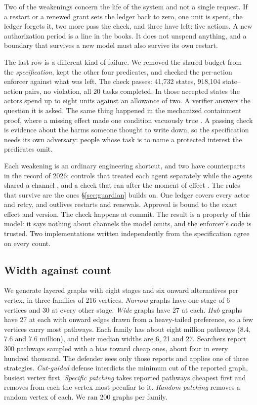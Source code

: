 \documentclass[10pt,twocolumn,letterpaper]{article}
\theoremstyle{definition}
\newcommand{\NarrowPaths}{8.4}
\newcommand{\HubPaths}{7.6}
\newcommand{\WidePaths}{7.6}
\newcommand{\WidthNarrow}{6}
\newcommand{\WidthHub}{21}
\newcommand{\WidthWide}{27}
\newcommand{\SeenPerHundredK}{four}
\newcommand{\BndTasks}{20}
\newcommand{\BndOmitStates}{41{,}732}
\newcommand{\BndOmitChecks}{918{,}104}
\newcommand{\BndOmitSpend}{eight}
\begin{document}
Two of the weakenings concern the life of the system and not a single request. If a restart or a renewed grant sets the ledger back to zero, one unit is spent, the ledger forgets it, two more pass the check, and three have left: five actions. A new authorization period is a line in the books. It does not unspend anything, and a boundary that survives a new model must also survive its own restart.

The last row is a different kind of failure. We removed the shared budget from the \emph{specification}, kept the other four predicates, and checked the per-action enforcer against what was left. The check passes: \BndOmitStates{} states, \BndOmitChecks{} state--action pairs, no violation, all \BndTasks{} tasks completed. In those accepted states the actors spend up to \BndOmitSpend{} units against an allowance of two. A verifier answers the question it is asked. The same thing happened in the mechanized containment proof, where a missing effect made one condition vacuously true \cite{moon}. A passing check is evidence about the harms someone thought to write down, so the specification needs its own adversary: people whose task is to name a protected interest the predicates omit.

Each weakening is an ordinary engineering shortcut, and two have counterparts in the record of 2026: controls that treated each agent separately while the agents shared a channel \cite{metr}, and a check that ran after the moment of effect \cite{metraudit}. The rules that survive are the ones \S\ref{sec:guardian} builds on. One ledger covers every actor and retry, and outlives restarts and renewals. Approval is bound to the exact effect and version. The check happens at commit. The result is a property of this model: it says nothing about channels the model omits, and the enforcer's code is trusted. Two implementations written independently from the specification agree on every count.

\subsection{Width against count}

We generate layered graphs with eight stages and six onward alternatives per vertex, in three families of 216 vertices. \emph{Narrow} graphs have one stage of 6 vertices and 30 at every other stage. \emph{Wide} graphs have 27 at each. \emph{Hub} graphs have 27 at each with onward edges drawn from a heavy-tailed preference, so a few vertices carry most pathways. Each family has about eight million pathways (\NarrowPaths, \HubPaths{} and \WidePaths{} million), and their median widths are \WidthNarrow, \WidthHub{} and \WidthWide. Searchers report 300 pathways sampled with a bias toward cheap ones, about \SeenPerHundredK{} in every hundred thousand. The defender sees only those reports and applies one of three strategies. \emph{Cut-guided} defense interdicts the minimum cut of the reported graph, busiest vertex first. \emph{Specific patching} takes reported pathways cheapest first and removes from each the vertex most peculiar to it. \emph{Random patching} removes a random vertex of each. We ran 200 graphs per family.
\end{document}
